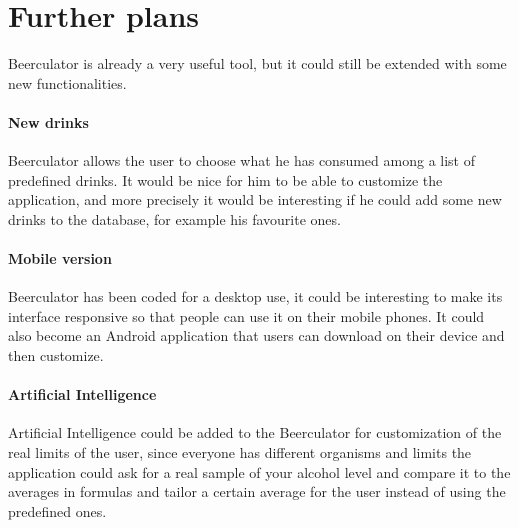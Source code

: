 \section{Further plans}
\label{sec:ideas}

Beerculator is already a very useful tool, but it could still be extended with some new functionalities. 

\paragraph{New drinks} Beerculator allows the user to choose what he has consumed among a list of predefined drinks. It would be nice for him to be able to customize the application, and more precisely it would be interesting if he could add some new drinks to the database, for example his favourite ones.
\paragraph{Mobile version} Beerculator has been coded for a desktop use, it could be interesting to make its interface responsive so that people can use it on their mobile phones. It could also become an Android application that users can download on their device and then customize.
\paragraph{Artificial Intelligence} Artificial Intelligence could be added to the Beerculator for customization of the real limits of the user, since everyone has different organisms and limits the application could ask for a real sample of your alcohol level and compare it to the averages in formulas and tailor a certain average for the user instead of using the predefined ones. 
